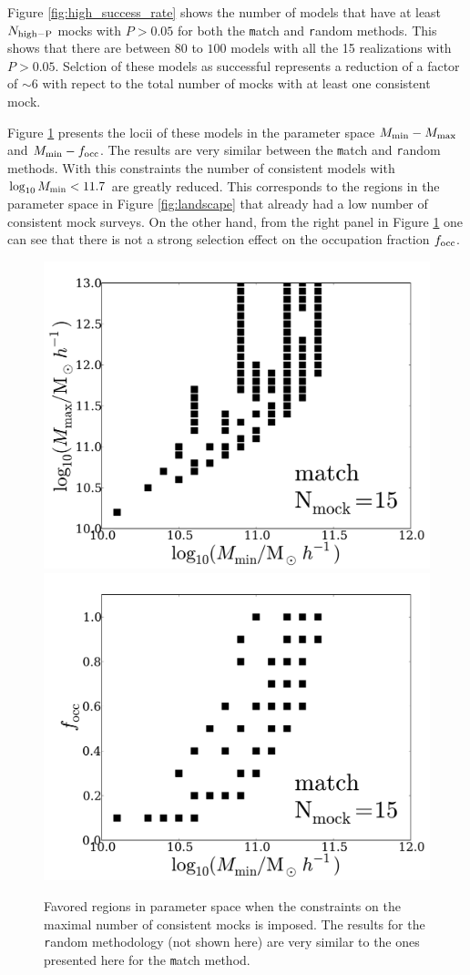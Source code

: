 \documentclass[usenatbib]{mn2e}
\begin{document}
Figure \ref{fig:high_success_rate} shows the number of models
that have at least $N_{\rm high-P}$ mocks with $P>0.05$ for both the
{\texttt  match} and {\texttt random} methods.  This shows that there
are between $80$ to $100$ models with all the 15 realizations with
$P>0.05$. Selction of these models as successful represents a
reduction of a factor of $\sim 6$ with repect to the total number of
mocks with at least one consistent mock.  

Figure \ref{fig:restriction_mock} presents the locii of these models
in the parameter space $M_{\rm min}-M_{\rm max}$ and $M_{\rm
  min}-f_{\rm occ}$. The results are very similar between the {\texttt
  match} and {\texttt random} methods. With this constraints the
number of consistent models with  $\log_{10}M_{\rm min}< 11.7$ are
greatly reduced. This corresponds to the regions in the parameter
space in Figure \ref{fig:landscape} that already had a low number of
consistent mock surveys. On the other hand, from the right panel in
Figure \ref{fig:restriction_mock} one can see that there is not a
strong selection effect on the occupation fraction $f_{\rm occ}$.  


\begin{figure}
\begin{center}
\includegraphics[width=0.46\linewidth,angle=0]{./plots/Fig5_match_mass_mock.pdf} 
\hspace{5mm}
\includegraphics[width=0.46\linewidth,angle=0]{./plots/Fig5_match_f_occ_mock.pdf}
\end{center}  
\caption{Favored regions in parameter space when the constraints on
  the maximal number of consistent mocks is imposed. The results for
  the {\texttt random} methodology (not shown here) are very similar to the ones
  presented here for the {\texttt match} method.
  \label{fig:restriction_mock}}  
\end{figure}
\end{document}
